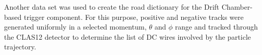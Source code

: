 Another data set was used to create the road dictionary for the Drift Chamber-based trigger component.  For this purpose, positive and negative tracks were generated uniformly  in a selected momentum, $\theta$ and $\phi$ range and tracked through the CLAS12 detector to determine the list of DC wires involved by the particle trajectory.
